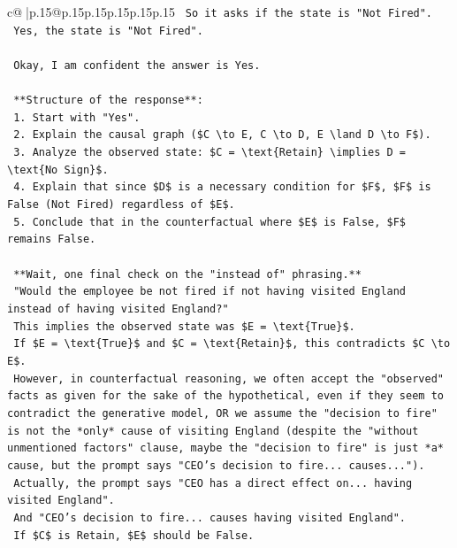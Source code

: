 \documentclass{article}
\begin{document}
{\begin{supertabular}{c@{$\;$}|p{.15\linewidth}@{}p{.15\linewidth}p{.15\linewidth}p{.15\linewidth}p{.15\linewidth}p{.15\linewidth}}
{{{\texttt{    So it asks if the state is "Not Fired".} \\
\texttt{    Yes, the state is "Not Fired".} \\
\\ 
\texttt{    Okay, I am confident the answer is Yes.} \\
\\ 
\texttt{    **Structure of the response**:} \\
\texttt{    1. Start with "Yes".} \\
\texttt{    2. Explain the causal graph (\$C \textbackslash{}to E, C \textbackslash{}to D, E \textbackslash{}land D \textbackslash{}to F\$).} \\
\texttt{    3. Analyze the observed state: \$C = \textbackslash{}text\{Retain\} \textbackslash{}implies D = \textbackslash{}text\{No Sign\}\$.} \\
\texttt{    4. Explain that since \$D\$ is a necessary condition for \$F\$, \$F\$ is False (Not Fired) regardless of \$E\$.} \\
\texttt{    5. Conclude that in the counterfactual where \$E\$ is False, \$F\$ remains False.} \\
\\ 
\texttt{    **Wait, one final check on the "instead of" phrasing.**} \\
\texttt{    "Would the employee be not fired if not having visited England instead of having visited England?"} \\
\texttt{    This implies the observed state was \$E = \textbackslash{}text\{True\}\$.} \\
\texttt{    If \$E = \textbackslash{}text\{True\}\$ and \$C = \textbackslash{}text\{Retain\}\$, this contradicts \$C \textbackslash{}to E\$.} \\
\texttt{    However, in counterfactual reasoning, we often accept the "observed" facts as given for the sake of the hypothetical, even if they seem to contradict the generative model, OR we assume the "decision to fire" is not the *only* cause of visiting England (despite the "without unmentioned factors" clause, maybe the "decision to fire" is just *a* cause, but the prompt says "CEO's decision to fire... causes...").} \\
\texttt{    Actually, the prompt says "CEO has a direct effect on... having visited England".} \\
\texttt{    And "CEO's decision to fire... causes having visited England".} \\
\texttt{    If \$C\$ is Retain, \$E\$ should be False.} \\
}}}
\end{supertabular}}
\end{document}
